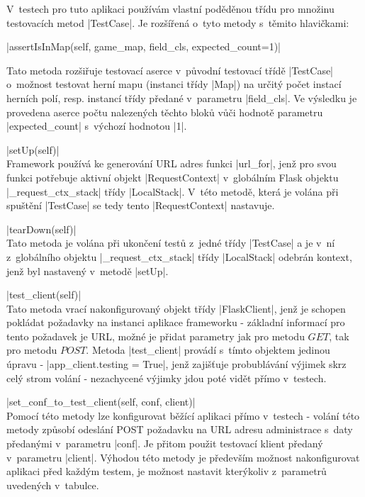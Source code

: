 V~testech pro tuto aplikaci používám vlastní poděděnou třídu pro množinu testovacích metod \ic|TestCase|. Je rozšířená o~tyto metody s~těmito hlavičkami:
\begin{description}
	\item \ic|assertIsInMap(self, game_map, field_cls, expected_count=1)|
    \begin{sloppypar}
	   Tato metoda rozšiřuje testovací aserce v~původní testovací třídě \ic|TestCase| o~možnost testovat herní mapu (instanci třídy \ic|Map|) na určitý počet instací herních polí, resp. instancí třídy předané v~parametru \ic|field_cls|. Ve výsledku je provedena aserce počtu nalezených těchto bloků vůči hodnotě parametru \ic|expected_count| s~výchozí hodnotou \ic|1|.
    \end{sloppypar}
    
    \item \ic|setUp(self)| \\
    Framework  používá ke generování URL adres funkci \ic|url_for|, jenž pro svou funkci potřebuje aktivní objekt \ic|RequestContext| v~globálním Flask objektu \ic|_request_ctx_stack| třídy \ic|LocalStack|. V~této metodě, která je volána při spuštění \ic|TestCase| se tedy tento \ic|RequestContext| nastavuje. 

    \item \ic|tearDown(self)| \\
    Tato metoda je volána při ukončení testů z~jedné třídy \ic|TestCase| a je v~ní z~globálního objektu \ic|_request_ctx_stack| třídy \ic|LocalStack| odebrán kontext, jenž byl nastavený v~metodě \ic|setUp|.

    \item \ic|test_client(self)| \\
    Tato metoda vrací nakonfigurovaný objekt třídy \ic|FlaskClient|, jenž je schopen pokládat požadavky na instanci aplikace frameworku  - základní informací pro tento požadavek je URL, možné je přidat parametry jak pro  metodu $GET$, tak pro metodu $POST$. Metoda \ic|test_client| provádí s~tímto objektem jedinou úpravu - \ic|app_client.testing = True|, jenž zajišťuje probublávání výjimek skrz celý strom volání - nezachycené výjimky jdou poté vidět přímo v~testech.

    \item \ic|set_conf_to_test_client(self, conf, client)| \\
    Pomocí této metody lze konfigurovat běžící aplikaci přímo v~testech - volání této metody způsobí odeslání POST požadavku na URL adresu administrace s~daty předanými v~parametru \ic|conf|. Je přitom použit testovací klient předaný v~parametru \ic|client|. Výhodou této metody je především možnost nakonfigurovat aplikaci před každým testem, je možnost nastavit kterýkoliv z~parametrů uvedených v~tabulce. 
\end{description}

